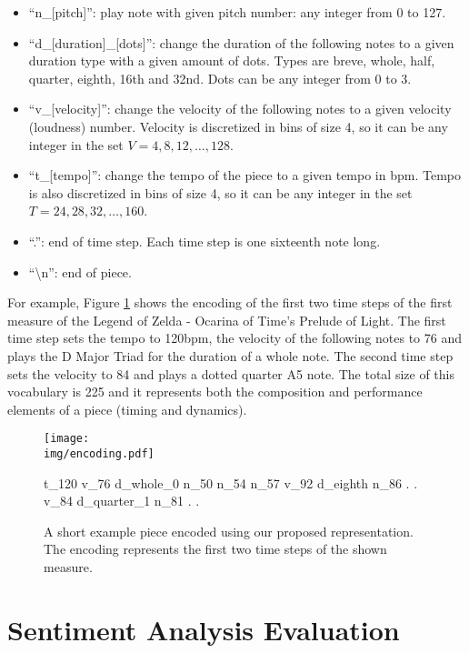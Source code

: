 \begin{itemize}
    \item ``n\_[pitch]'': play note with given pitch number: any integer from 0 to 127.
    \item ``d\_[duration]\_[dots]'': change the duration of the following notes to a given
    duration type with a given amount of dots. Types are breve, whole, half, quarter,
    eighth, 16th and 32nd. Dots can be any integer from 0 to 3.
    \item ``v\_[velocity]'': change the velocity of the following  notes to a given velocity (loudness) number. Velocity is discretized in
    bins of size 4, so it can be any integer in the set $V = {4, 8, 12, \dots, 128}$.
    \item ``t\_[tempo]'': change the tempo of the piece to a given tempo in bpm. Tempo is also discretized in bins of size 4, so it can be any integer in the set $T = {24, 28, 32, \dots, 160}$.
    \item ``.'': end of time step. Each time step is one sixteenth note long.
    \item ``\textbackslash n'': end of piece.
\end{itemize}

For example, Figure \ref{fig:enc_ex} shows the encoding of the first two time steps of the
first measure of the Legend of Zelda - Ocarina of Time's Prelude of Light.
The first time step sets the tempo to 120bpm, the velocity of the following notes to
76 and plays the D Major Triad for the duration of a whole note. The second time step sets the velocity to 84 and plays a dotted quarter A5 note. The total size of this vocabulary is 225 and it represents both the composition and performance elements of a piece (timing and dynamics).

\begin{figure}
 \centering
 \texttt{[image: \\img/encoding.pdf]}
\begin{spverbatim}
t_120 v_76 d_whole_0 n_50 n_54 n_57
v_92 d_eighth n_86 . . v_84 d_quarter_1 n_81 . .
\end{spverbatim}

 \caption{A short example piece encoded using our proposed representation. The encoding represents the first two time steps of the shown measure.}
 \label{fig:enc_ex}
\end{figure}


\section{Sentiment Analysis Evaluation}

